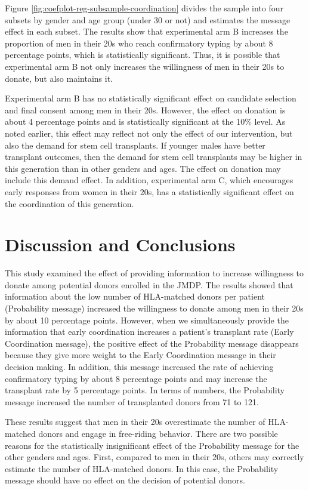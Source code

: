 \documentclass[
]{article}
\begin{document}
Figure \ref{fig:coefplot-reg-subsample-coordination} divides the sample into four subsets by gender and age group (under 30 or not) and estimates the message effect in each subset. The results show that experimental arm B increases the proportion of men in their 20s who reach confirmatory typing by about 8 percentage points, which is statistically significant. Thus, it is possible that experimental arm B not only increases the willingness of men in their 20s to donate, but also maintains it.

Experimental arm B has no statistically significant effect on candidate selection and final consent among men in their 20s. However, the effect on donation is about 4 percentage points and is statistically significant at the 10\% level. As noted earlier, this effect may reflect not only the effect of our intervention, but also the demand for stem cell transplants. If younger males have better transplant outcomes, then the demand for stem cell transplants may be higher in this generation than in other genders and ages. The effect on donation may include this demand effect. In addition, experimental arm C, which encourages early responses from women in their 20s, has a statistically significant effect on the coordination of this generation.

\hypertarget{conclusion}{%
\section{Discussion and Conclusions}\label{conclusion}}

This study examined the effect of providing information to increase willingness to donate among potential donors enrolled in the JMDP. The results showed that information about the low number of HLA-matched donors per patient (Probability message) increased the willingness to donate among men in their 20s by about 10 percentage points. However, when we simultaneously provide the information that early coordination increases a patient's transplant rate (Early Coordination message), the positive effect of the Probability message disappears because they give more weight to the Early Coordination message in their decision making. In addition, this message increased the rate of achieving confirmatory typing by about 8 percentage points and may increase the transplant rate by 5 percentage points. In terms of numbers, the Probability message increased the number of transplanted donors from 71 to 121.

These results suggest that men in their 20s overestimate the number of HLA-matched donors and engage in free-riding behavior. There are two possible reasons for the statistically insignificant effect of the Probability message for the other genders and ages. First, compared to men in their 20s, others may correctly estimate the number of HLA-matched donors. In this case, the Probability message should have no effect on the decision of potential donors.
\end{document}
